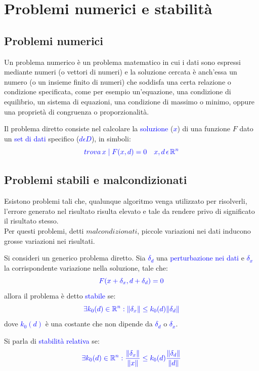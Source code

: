 \chapter{Problemi numerici e stabilità}


\section{Problemi numerici}

Un problema numerico è un problema matematico in cui i dati sono espressi mediante numeri 
(o vettori di numeri) e la soluzione cercata è anch'essa un numero (o un insieme finito di numeri)
che soddisfa una certa relazione o condizione specificata, come per esempio un'equazione,
una condizione di equilibrio, un sistema di equazioni, una condizione di massimo o minimo, oppure una proprietà di congruenza o proporzionalità.

\begin{defi}
Il problema diretto consiste nel calcolare la \textcolor{blue}{soluzione} (\textcolor{blue}{$x$}) di una funzione $F$ dato un \textcolor{blue}{set di dati} specifico (\textcolor{blue}{$d \epsilon D$}), in simboli:
\[
\textcolor{blue}{trova \, {x} \mid F(x, d) = 0 \quad x,d \, \epsilon \, \mathbb{R}^n}
\]

\end{defi}

\section{Problemi stabili e malcondizionati}

Esistono problemi tali che, qualunque algoritmo venga utilizzato per risolverli,
l'errore generato nel risultato risulta elevato e tale da rendere privo di significato il risultato stesso. \\
Per questi problemi, detti $malcondizionati$, piccole variazioni nei dati inducono grosse variazioni nei risultati.

\begin{defi}[Stabilità]
Si consideri un generico problema diretto. Sia \textcolor{blue}{$\delta_d$} una \textcolor{blue}{perturbazione nei dati} e \textcolor{blue}{$\delta_x$}
la corrispondente variazione nella soluzione, tale che:
\[
\textcolor{blue}{F(x+\delta_x, d+\delta_d)=0}
\] 
allora il problema è detto \textcolor{blue}{stabile} se:
\[
\textcolor{blue}{\exists k_0(d) \in \mathbb{R}^n : \|\delta_x\| \leq k_0(d) \|\delta_d\|}
\]
dove \textcolor{blue}{$k_0(d)$} è una costante che non dipende da \textcolor{blue}{$\delta_d$}
o \textcolor{blue}{$\delta_x$}.

Si parla di \textcolor{blue}{stabilità relativa} se:
\[
\textcolor{blue}{\exists k_0(d) \in \mathbb{R}^n : \frac{\|\delta_x\|}{\|x\|} \leq k_0(d) \frac{\|\delta_d\|}{\|d\|}}
\]
\end{defi}


